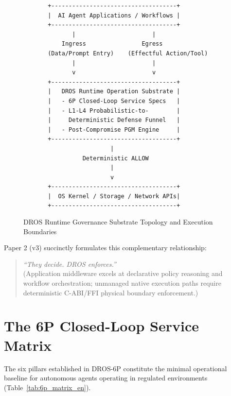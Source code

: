 \documentclass[conference]{IEEEtran}
\begin{document}
\begin{figure}[!t]
\centering
\begin{verbatim}
       +------------------------------------+
       |  AI Agent Applications / Workflows |
       +------------------------------------+
              |                      |
           Ingress                Egress
       (Data/Prompt Entry)    (Effectful Action/Tool)
              |                      |
              v                      v
       +------------------------------------+
       |   DROS Runtime Operation Substrate |
       |   - 6P Closed-Loop Service Specs   |
       |   - L1-L4 Probabilistic-to-        |
       |     Deterministic Defense Funnel   |
       |   - Post-Compromise PGM Engine     |
       +------------------------------------+
                         |
                 Deterministic ALLOW
                         |
                         v
       +------------------------------------+
       |  OS Kernel / Storage / Network APIs|
       +------------------------------------+
\end{verbatim}
\caption{DROS Runtime Governance Substrate Topology and Execution Boundaries}
\label{fig:topology_en}
\end{figure}

Paper 2 (v3) succinctly formulates this complementary relationship:
\begin{quote}
\textit{``They decide. DROS enforces.''} \\
(Application middleware excels at declarative policy reasoning and workflow orchestration; unmanaged native execution paths require deterministic C-ABI/FFI physical boundary enforcement.)
\end{quote}

\section{The 6P Closed-Loop Service Matrix}
The six pillars established in DROS-6P constitute the minimal operational baseline for autonomous agents operating in regulated environments (Table~\ref{tab:6p_matrix_en}).
\end{document}
